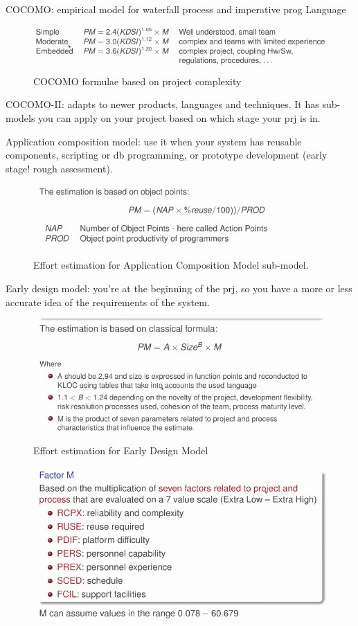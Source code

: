 \noindent COCOMO: empirical model for waterfall process and imperative prog Language

\begin{figure} [H]
    \centering
    \includegraphics[width=0.75\linewidth]{Figures//05/cocomo1.png}
    \caption{COCOMO formulae based on project complexity}
\end{figure}

\noindent COCOMO-II: adapts to newer products, languages and techniques. It has sub-models you can apply on your project based on which stage your prj is in.

\noindent Application composition model: use it when your system has reusable components, scripting or db programming, or prototype development (early stage! rough assessment).
\begin{figure} [H]
    \centering
    \includegraphics[width=0.75\linewidth]{Figures//05/cocomo2acm.png}
    \caption{Effort estimation for Application Composition Model sub-model.}
\end{figure}

\noindent Early design model: you're at the beginning of the prj, so you have a more or less accurate idea of the requirements of the system.

\begin{figure} [H]
    \centering
    \includegraphics[width=0.75\linewidth]{Figures//05/cocomo2edm.png}
    \caption{Effort estimation for Early Design Model}
\end{figure}

\begin{figure} [H]
    \centering
    \includegraphics[width=0.75\linewidth]{Figures//05/cocomo2edm2.png}
\end{figure}

